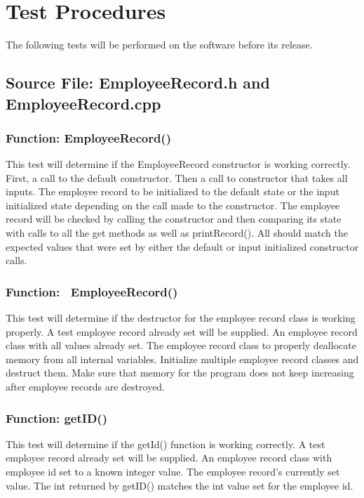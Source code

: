 \documentclass[12pt]{article}%
\newcounter{subsubsubsection}[subsubsection]
\begin{document}
\section{Test Procedures}
The following tests will be performed on the software before its release.
\subsection{Source File: EmployeeRecord.h and EmployeeRecord.cpp}
\subsubsection{Function: EmployeeRecord()}
This test will determine if the EmployeeRecord constructor is working correctly.
First, a call to the default constructor. Then a call to constructor that takes all inputs.
The employee record to be initialized to the default state or the input initialized state
depending on the call made to the constructor.
The employee record will be checked by calling the constructor and then comparing its state with
calls to all the get methods as well as printRecord(). All should match the expected values that
were set by either the default or input initialized constructor calls.

\subsubsection{Function: ~EmployeeRecord()}
This test will determine if the destructor for the employee record class is working properly. A test
employee record already set will be supplied.
An employee record class with all values already set.
The employee record class to properly deallocate memory from all internal variables.
Initialize multiple employee record classes and destruct them. Make sure that memory for the program does
not keep increasing after employee records are destroyed.

\subsubsection{Function: getID()}
This test will determine if the getId() function is working correctly. A test
employee record already set will be supplied.
An employee record class with employee id set to a known integer value.
The employee record's currently set value.
The int returned by getID() matches the int value set for the employee id.
\end{document}
